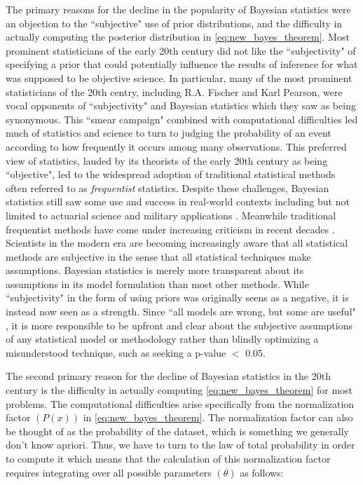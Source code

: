The primary reasons for the decline in the popularity of Bayesian statistics were an objection to the ``subjective" use of prior distributions, and the difficulty in actually computing the posterior distribution in \ref{eq:new_bayes_theorem}. Most prominent statisticians of the early 20th century did not like the ``subjectivity" of specifying a prior that could potentially influence the results of inference for what was supposed to be objective science. In particular, many of the most prominent statisticians of the 20th centry, including R.A. Fischer and Karl Pearson, were vocal opponents of ``subjectivity" and Bayesian statistics which they saw as being synonymous. This ``smear campaign" combined with computational difficulties led much of statistics and science to turn to judging the probability of an event according to how frequently it occurs among many observations. This preferred view of statistics, lauded by its theorists of the early 20th century as being ``objective", led to the widespread adoption of traditional statistical methods often referred to as \textit{frequentist} statistics. Despite these challenges, Bayesian statistics still saw some use and success in real-world contexts including but not limited to actuarial science and military applications \cite{McGrayne2011}. Meanwhile traditional frequentist methods have come under increasing criticism in recent decades \cite{Ioannidis2005} \cite{Begley2015}. Scientists in the modern era are becoming increasingly aware that all statistical methods are subjective in the sense that all statistical techniques make assumptions. Bayesian statistics is merely more transparent about its assumptions in its model formulation than most other methods. While ``subjectivity" in the form of using priors was originally seens as a negative, it is instead now seen as a strength. Since ``all models are wrong, but some are useful" \cite{Box1976}, it is more responsible to be upfront and clear about the subjective assumptions of any statistical model or methodology rather than blindly optimizing a misunderstood technique, such as seeking a p-value $<$ 0.05.

The second primary reason for the decline of Bayesian statistics in the 20th century is the difficulty in actually computing \ref{eq:new_bayes_theorem} for most problems. The computational difficulties arise specifically from the normalization factor $(P(x))$ in \ref{eq:new_bayes_theorem}. The normalization factor can also be thought of as the probability of the dataset, which is something we generally don't know apriori. Thus, we have to turn to the law of total probability in order to compute it which means that the calculation of this normalization factor requires integrating over all possible parameters $(\theta)$ as follows:

